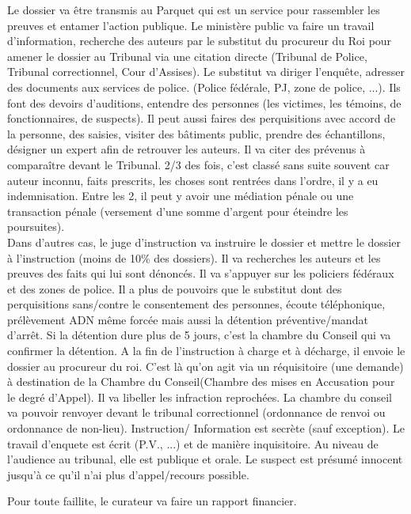 \documentclass{book}
\begin{document}
Le dossier va être transmis au Parquet qui est un service pour rassembler les preuves et entamer l'action publique. Le ministère public va faire un travail d'information, recherche des auteurs par le substitut du procureur du Roi pour amener le dossier au Tribunal via une citation directe (Tribunal de Police, Tribunal correctionnel, Cour d'Assises). Le substitut va diriger l'enquête, adresser des documents aux services de police. (Police fédérale, PJ, zone de police, ...). Ils font des devoirs d'auditions, entendre des personnes (les victimes, les témoins, de fonctionnaires, de suspects). Il peut aussi faires des perquisitions avec accord de la personne, des saisies, visiter des bâtiments public, prendre des échantillons, désigner un expert afin de  retrouver les auteurs. Il va citer des prévenus à comparaître devant le Tribunal. 2/3 des fois, c'est classé sans suite souvent car auteur inconnu, faits prescrits, les choses sont rentrées dans l'ordre, il y a eu indemnisation. Entre les 2, il peut y avoir une médiation pénale ou une transaction pénale (versement d'une somme d'argent pour éteindre les poursuites).\\

Dans d'autres cas, le juge d'instruction va instruire le dossier et mettre le dossier à l'instruction (moins de 10\% des dossiers). Il va recherches les auteurs et les preuves des faits qui lui sont dénoncés. Il va s'appuyer sur les policiers fédéraux et des zones de police. Il a plus de pouvoirs que le substitut dont des perquisitions sans/contre le consentement des personnes, écoute téléphonique, prélèvement ADN même forcée mais aussi la détention préventive/mandat d'arrêt. Si la détention dure plus de 5 jours, c'est la chambre du Conseil qui va confirmer la détention. A la fin de l'instruction à charge et à décharge, il envoie le dossier au procureur du roi. C'est là qu'on agit via un réquisitoire (une demande) à destination de la Chambre du Conseil(Chambre des mises en Accusation pour le degré d'Appel). Il va libeller les infraction reprochées. La chambre du conseil va pouvoir renvoyer devant le tribunal correctionnel  (ordonnance de renvoi ou ordonnance de non-lieu). Instruction/ Information est secrète (sauf exception). Le travail d'enquete est écrit (P.V., ...) et de manière inquisitoire. Au niveau de l'audience au tribunal, elle est publique et orale. Le suspect est présumé innocent jusqu'à ce qu'il n'ai plus d'appel/recours possible.

Pour toute faillite, le curateur va faire un rapport financier.















\nocite{*}

\end{document}
